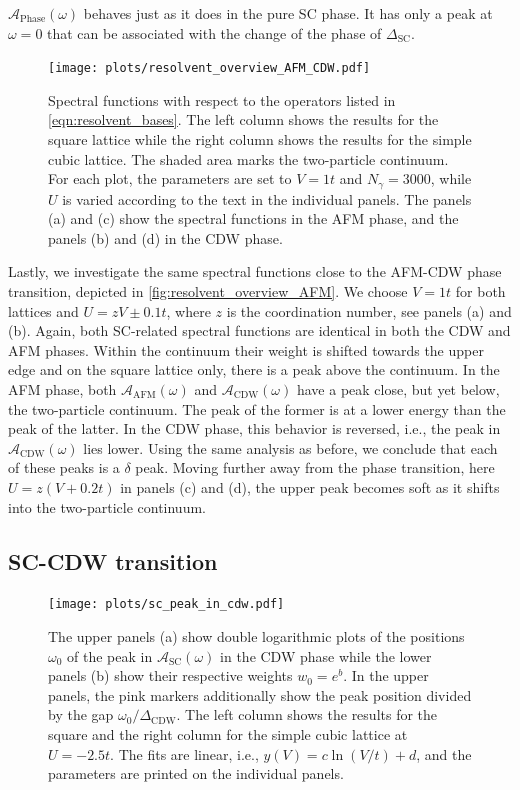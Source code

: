 \documentclass[
    reprint, 
    aps,
    preprintnumbers,
    twocolumn,
    prb,
    superscriptaddress
]{revtex4-2}
\newcommand{\spectral}[1]{\mathcal{A}_\text{#1}  (\omega)}
\begin{document}
$\spectral{Phase}$ behaves just as it does in the pure SC phase. It has only a peak at $\omega = 0$ that can be associated with the change of the phase of $\Delta_\text{SC}$.


\begin{figure}
    \centering
    \texttt{[image: plots/resolvent\_overview\_AFM\_CDW.pdf]}
    \caption{Spectral functions with respect to the operators listed in \eqref{eqn:resolvent_bases}.
    The left column shows the results for the square lattice while the right column shows the results for the simple cubic lattice.
    The shaded area marks the two-particle continuum.
    For each plot, the parameters are set to $V=1t$ and $N_\gamma = 3000$, while $U$ is varied according to the text in the individual panels.
    The panels (a) and (c) show the spectral functions in the AFM phase, and the panels (b) and (d) in the CDW phase.}
    \label{fig:resolvent_overview_AFM}
\end{figure}

Lastly, we investigate the same spectral functions close to the AFM-CDW phase transition, depicted in \autoref{fig:resolvent_overview_AFM}.
We choose $V=1t$ for both lattices and $U=zV \pm 0.1t$, where $z$ is the coordination number, see panels (a) and (b).
Again, both SC-related spectral functions are identical in both the CDW and AFM phases.
Within the continuum their weight is shifted towards the upper edge and on the square lattice only, there is a peak above the continuum.
In the AFM phase, both $\spectral{AFM}$ and $\spectral{CDW}$ have a peak close, but yet below, the two-particle continuum.
The peak of the former is at a lower energy than the peak of the latter.
In the CDW phase, this behavior is reversed, i.e., the peak in $\spectral{CDW}$ lies lower.
Using the same analysis as before, we conclude that each of these peaks is a $\delta$ peak.
Moving further away from the phase transition, here $U=z(V+0.2t)$ in panels (c) and (d), the upper peak becomes soft as it shifts into the two-particle continuum. 

\subsection{SC-CDW transition}

\begin{figure}
    \centering
    \texttt{[image: plots/sc\_peak\_in\_cdw.pdf]}
    \caption{The upper panels (a) show double logarithmic plots of the positions $\omega_0$ of the peak in $\spectral{SC}$ in the CDW phase while the lower panels (b) show their respective weights $w_0 = e^{b}$.
    In the upper panels, the pink markers additionally show the peak position divided by the gap $\omega_0 / \Delta_\text{CDW}$.
    The left column shows the results for the square and the right column for the simple cubic lattice at $U=-2.5t$.
    The fits are linear, i.e., $y(V) = c \ln(V/t) + d$, and the parameters are printed on the individual panels.}
    \label{fig:sc_in_cdw_behavior}
\end{figure}
\end{document}
